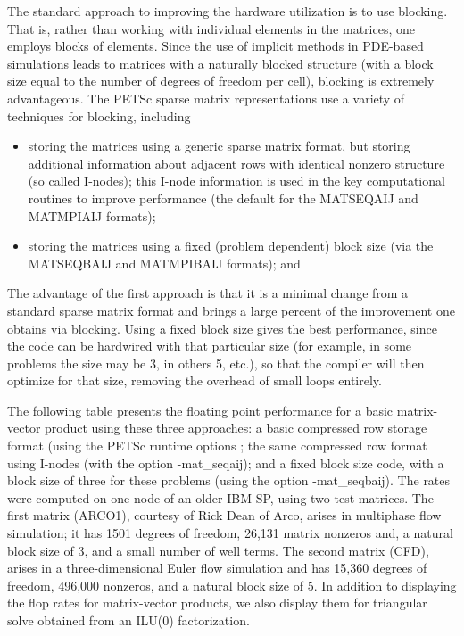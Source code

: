 \documentclass[twoside,12pt]{../sty/report_petsc}
\begin{document}
The standard approach to improving the hardware utilization is to use
blocking. That is, rather than working with individual elements in
the matrices, one employs blocks of elements.  Since the use of
implicit methods in PDE-based simulations leads to matrices with a
naturally blocked structure (with a block size equal to the number of
degrees of freedom per cell), blocking is extremely advantageous.  The
PETSc sparse matrix representations use a variety
of techniques for blocking, including

\begin{itemize}
\item storing the matrices using a generic sparse matrix format, but
   storing additional information about adjacent rows with identical
   nonzero structure (so called I-nodes); this I-node information is
   used in the key computational routines to improve performance
   (the default for the MATSEQAIJ and MATMPIAIJ formats);
\item storing the matrices using a fixed (problem dependent) block size
   (via the MATSEQBAIJ and MATMPIBAIJ formats); and
\end{itemize}

The advantage of the first approach is that it is a minimal change
from a standard sparse matrix format and brings a large percent of the
improvement one obtains via blocking.  Using a fixed block size gives
the best performance, since the code can be hardwired with that
particular size (for example, in some problems the size may be 3, in
others 5, etc.), so that the compiler will then optimize for that
size, removing the overhead of small loops entirely.

The following table presents the floating point performance
for a basic matrix-vector product using these three approaches: a basic
compressed row storage format (using the PETSc runtime options
; the same compressed row format using
I-nodes (with the option {-mat\_seqaij}); and a fixed block size code,
with a block size of three for these problems (using the option
{-mat\_seqbaij}). The rates were computed on one
node of an older IBM SP, using two test matrices.  The first matrix
(ARCO1), courtesy of Rick Dean of Arco, arises in multiphase flow
simulation; it has 1501 degrees of freedom, 26,131 matrix nonzeros
and, a natural block size of 3, and a small number of well terms. The
second matrix (CFD), arises in a three-dimensional Euler flow
simulation and has 15,360 degrees of freedom, 496,000 nonzeros, and a
natural block size of 5. In addition to displaying the flop rates for
matrix-vector products, we also display them for triangular solve
obtained from an ILU(0) factorization.
\end{document}

